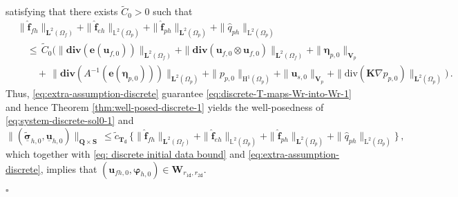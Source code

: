 \documentclass[11pt]{article}
\numberwithin{equation}{section}
\newcommand{\bbeta}{{\boldsymbol\eta}}
\newcommand{\bsi}{{\boldsymbol\sigma}}
\newcommand{\bvarphi}{{\boldsymbol\varphi}}
\newcommand{\ubsi}{\underline{\bsi}}
\newcommand{\ubu}{\underline{\bu}}
\newcommand{\f}{\mathbf{f}}
\newcommand{\bu}{\mathbf{u}}
\newcommand{\be}{{\mathbf{e}}}
\newcommand{\0}{{\mathbf{0}}}
\def\bK{\mathbf{K}}
\def\bV{\mathbf{V}}
\def\bW{\mathbf{W}}
\def\bT{\mathbf{T}}
\def\bQ{\mathbf{Q}}
\def\bS{\mathbf{S}}
\newcommand{\bL}{\mathbf{L}}
\newcommand\bbL{\mathbb{L}}
\def\H{\mathrm{H}}
\def\L{\mathrm{L}}
\def\ttd{\mathtt{d}}
\def\bdiv{\mathbf{div}}
\def\div{\mathrm{div}}
\def\wt{\widetilde}
\def\wh{\widehat}
\newenvironment{proof}{\noindent{\it Proof.}}{\hfill$\square$}
\numberwithin{equation}{section}
\begin{document}
\begin{proof}
satisfying that there exists $\wt{C}_0 > 0$ such that
\begin{align}
& \|\wh{\f}_{fh}\|_{\bL^2(\Omega_f)} + \|\wh{\f}_{eh}\|_{\bbL^2(\Omega_p)} +  \|\wh{\f}_{ph}\|_{\bL^2(\Omega_p)} + \|\wh{q}_{ph}\|_{\L^2(\Omega_p)}  \nonumber \\
&\quad \leq\, \wt{C}_0 \Big(\|\bdiv(\be(\bu_{f,0}))\|_{\bL^{2}(\Omega_f)} 
+ \|\bdiv(\bu_{f,0}\otimes\bu_{f,0})\|_{\bL^{2}(\Omega_f)} 
+ \|\bbeta_{p,0}\|_{\bV_p} \nonumber \\
&\qquad +\, \|\bdiv(A^{-1}(\be(\bbeta_{p,0})))\|_{\bL^2(\Omega_p)}
+ \|p_{p,0}\|_{\H^1(\Omega_p)} 
+ \|\bu_{s,0}\|_{\bV_p} 
+ \|\div(\bK\nabla p_{p,0})\|_{\bL^2(\Omega_p)}\Big) \,. \label{eq: discrete initial data bound}
\end{align}
Thus, \eqref{eq:extra-assumption-discrete} guarantee \eqref{eq:discrete-T-maps-Wr-into-Wr-1} and hence Theorem \ref{thm:well-posed-discrete-1} yields the well-posedness of 
\eqref{eq:system-discrete-sol0-1} and 
\begin{equation}\label{eqn:discrete-soln-1-bound}
\|(\widetilde{\ubsi}_{h,0}, \ubu_{h,0})\|_{\bQ\times \bS} 
\,\leq \widetilde{c}_{\bT_{\ttd}}\,\Big\{ \|\wh{\f}_{fh}\|_{\bL^2(\Omega_f)} 
+ \|\wh{\f}_{eh}\|_{\bbL^2(\Omega_p)}
+ \|\wh{\f}_{ph}\|_{\bL^2(\Omega_p)} + \| \wh{q}_{ph}\|_{\L^2(\Omega_p)}\Big\} \,,
\end{equation}
which together with \eqref{eq: discrete initial data bound} and \eqref{eq:extra-assumption-discrete}, implies that  $(\bu_{fh,0},\bvarphi_{h,0})\in \bW_{r_{1\ttd},r_{2\ttd}}$.


\end{proof}
\end{document}
